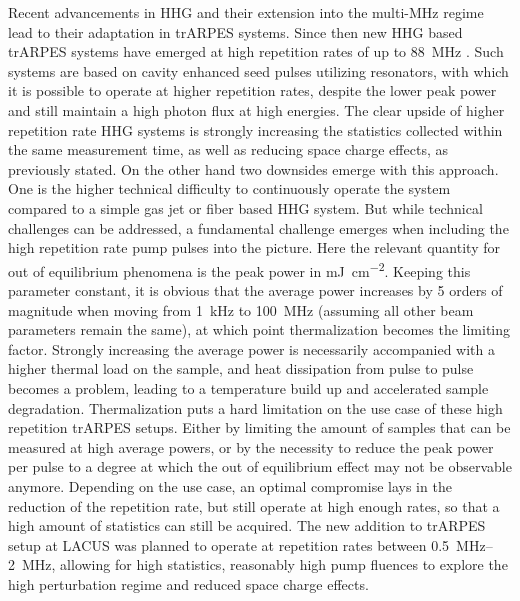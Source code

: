 Recent advancements in HHG and their extension into the multi-\unit{\mega\hertz} regime \cite{mills_xuv_2012,hadrich_high_2014,pronin_high-power_2015,saraceno_toward_2015,hadrich_single-pass_2016,carstens_high-harmonic_2016,zhao_efficient_2018} lead to their adaptation in trARPES systems.
Since then new HHG based trARPES systems have emerged at high repetition rates of up to \qty{88}{\mega\hertz} \cite{corder_ultrafast_2018,mills_cavity-enhanced_2019}.
Such systems are based on cavity enhanced seed pulses utilizing resonators, with which it is possible to operate at higher repetition rates, despite the lower peak power and still maintain a high photon flux at high energies.
The clear upside of higher repetition rate HHG systems is strongly increasing the statistics collected within the same measurement time, as well as reducing space charge effects, as previously stated.
On the other hand two downsides emerge with this approach.
One is the higher technical difficulty to continuously operate the system compared to a simple gas jet or fiber based HHG system.
But while technical challenges can be addressed, a fundamental challenge emerges when including the high repetition rate pump pulses into the picture.
Here the relevant quantity for out of equilibrium phenomena is the peak power in \unit{\milli\joule\per\centi\meter^2}.
Keeping this parameter constant, it is obvious that the average power increases by 5 orders of magnitude when moving from \qty{1}{\kilo\hertz} to \qty{100}{\mega\hertz} (assuming all other beam parameters remain the same), at which point thermalization becomes the limiting factor.
Strongly increasing the average power is necessarily accompanied with a higher thermal load on the sample, and heat dissipation from pulse to pulse becomes a problem, leading to a temperature build up and accelerated sample degradation.
Thermalization puts a hard limitation on the use case of these high repetition trARPES setups.
Either by limiting the amount of samples that can be measured at high average powers, or by the necessity to reduce the peak power per pulse to a degree at which the out of equilibrium effect may not be observable anymore.
Depending on the use case, an optimal compromise lays in the reduction of the repetition rate, but still operate at high enough rates, so that a high amount of statistics can still be acquired.
The new addition to trARPES setup at LACUS was planned to operate at repetition rates between \qtyrange{0.5}{2}{\mega\hertz}, allowing for high statistics, reasonably high pump fluences to explore the high perturbation regime and reduced space charge effects.

